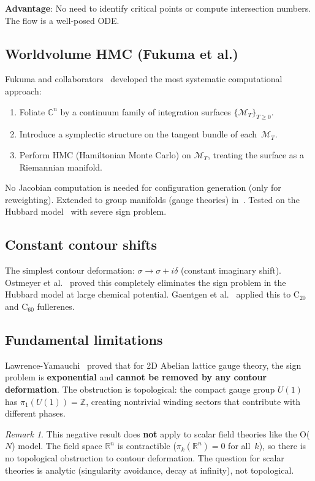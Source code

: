 \documentclass[12pt]{article}
\theoremstyle{definition}
\theoremstyle{remark}
\newtheorem{remark}[theorem]{Remark}
\newcommand{\R}{\mathbb{R}}
\newcommand{\C}{\mathbb{C}}
\newcommand{\Z}{\mathbb{Z}}
\begin{document}
\textbf{Advantage}: No need to identify critical points or compute
intersection numbers. The flow is a well-posed ODE.

\subsection{Worldvolume HMC (Fukuma et al.)}

Fukuma and collaborators~\cite{Fukuma20,Fukuma23,Fukuma25,Fukuma26}
developed the most systematic computational approach:
\begin{enumerate}
\item Foliate $\C^n$ by a continuum family of integration surfaces
  $\{\mathcal{M}_T\}_{T \ge 0}$.
\item Introduce a symplectic structure on the tangent bundle of
  each~$\mathcal{M}_T$.
\item Perform HMC (Hamiltonian Monte Carlo) on $\mathcal{M}_T$,
  treating the surface as a Riemannian manifold.
\end{enumerate}
No Jacobian computation is needed for configuration generation
(only for reweighting). Extended to group manifolds (gauge theories)
in~\cite{Fukuma26}. Tested on the Hubbard model~\cite{Fukuma25b}
with severe sign problem.

\subsection{Constant contour shifts}

The simplest contour deformation: $\sigma \to \sigma + i\delta$
(constant imaginary shift). Ostmeyer et al.~\cite{Ostmeyer23}
proved this completely eliminates the sign problem in the Hubbard
model at large chemical potential. Gaentgen et al.~\cite{Gaentgen24}
applied this to C$_{20}$ and C$_{60}$ fullerenes.

\subsection{Fundamental limitations}

Lawrence-Yamauchi~\cite{LY24} proved that for 2D Abelian lattice
gauge theory, the sign problem is \textbf{exponential} and
\textbf{cannot be removed by any contour deformation}. The
obstruction is topological: the compact gauge group $U(1)$ has
$\pi_1(U(1)) = \Z$, creating nontrivial winding sectors that
contribute with different phases.

\begin{remark}
This negative result does \textbf{not} apply to scalar field theories
like the O($N$) model. The field space $\R^n$ is contractible
($\pi_k(\R^n) = 0$ for all~$k$), so there is no topological
obstruction to contour deformation. The question for scalar theories
is analytic (singularity avoidance, decay at infinity), not topological.
\end{remark}
\end{document}
